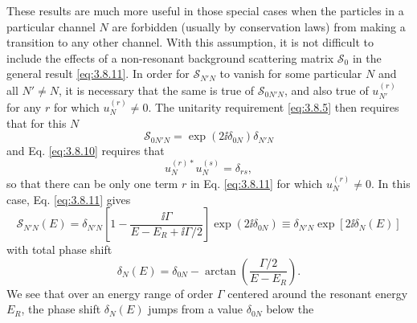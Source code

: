 These results are much more useful in those special cases when the particles
in a particular channel $N$ are forbidden (usually by conservation laws) from
making a transition to any other channel. With this assumption, it is not
difficult to include the effects of a non-resonant background scattering
matrix $\mathcal S_0$ in the general result \eqref{eq:3.8.11}. In order for
$\mathcal S_{N'N}$ to vanish for some particular $N$ and all $N'\neq N$, it
is necessary that the same is true of $\mathcal S_{0N'N}$, and also true of
$u_{N'}^{(r)}$ for any $r$ for which $u_N^{(r)}\neq0$. The unitarity
requirement \eqref{eq:3.8.5} then requires that for this $N$
\[
  \mathcal S_{0N'N}=\exp(2\ii\delta_{0N})\delta_{N'N}
\]
and Eq. \eqref{eq:3.8.10} requires that
\[
  u_N^{(r)*}u_N^{(s)}=\delta_{rs},
\]
so that there can be only one term $r$ in Eq. \eqref{eq:3.8.11} for which
$u_N^{(r)}\neq0$. In this case, Eq. \eqref{eq:3.8.11} gives
\[
  \mathcal S_{N'N}(E)=\delta_{N'N}
   \left[1-\frac{\ii\Gamma}{E-E_R+\ii\Gamma/2}\right]
   \exp(2\ii\delta_{0N})
  \equiv\delta_{N'N}\exp[2\ii\delta_N(E)]
\]
with total phase shift
\begin{equation}
  \delta_N(E)=\delta_{0N}-\arctan\!\left(\frac{\Gamma/2}{E-E_R}\right).
  \tag{3.8.21}\label{eq:3.8.21}
\end{equation}
We see that over an energy range of order $\Gamma$ centered around the
resonant energy $E_R$, the phase shift $\delta_N(E)$ jumps from a value
$\delta_{0N}$ below the
